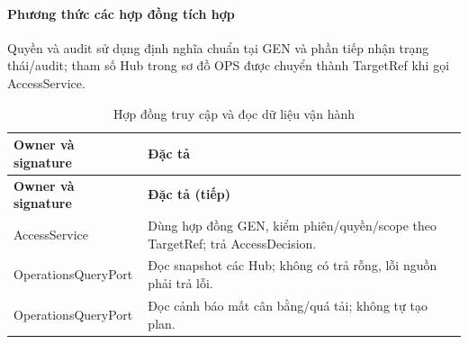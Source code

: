 \paragraph{Phương thức các hợp đồng tích hợp}
Quyền và audit sử dụng định nghĩa chuẩn tại GEN và phần tiếp nhận trạng thái/audit; tham số Hub trong sơ đồ OPS được chuyển thành TargetRef khi gọi AccessService.

\begin{longtable}{|L{58mm}|L{81mm}|}
\caption{Hợp đồng truy cập và đọc dữ liệu vận hành}\\\hline
\textbf{Owner và signature} & \textbf{Đặc tả}\\\hline
\endfirsthead
\hline\textbf{Owner và signature} & \textbf{Đặc tả (tiếp)}\\\hline\endhead
AccessService\par{} &
Dùng hợp đồng GEN, kiểm phiên/quyền/scope theo TargetRef; trả AccessDecision.\\\hline
OperationsQueryPort\par{} &
Đọc snapshot các Hub; không có trả rỗng, lỗi nguồn phải trả lỗi.\\\hline
OperationsQueryPort\par{} &
Đọc cảnh báo mất cân bằng/quá tải; không tự tạo plan.\\\hline
\end{longtable}

